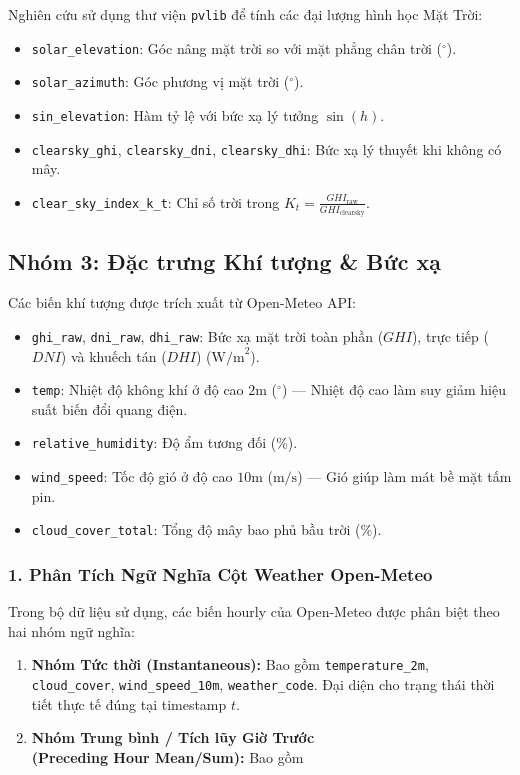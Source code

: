 \documentclass[12pt,a4paper]{article}
\begin{document}
Nghiên cứu sử dụng thư viện \texttt{pvlib} để tính các đại lượng hình học Mặt Trời:
\begin{itemize}
    \item \texttt{solar\_elevation}: Góc nâng mặt trời so với mặt phẳng chân trời ($^\circ$).
    \item \texttt{solar\_azimuth}: Góc phương vị mặt trời ($^\circ$).
    \item \texttt{sin\_elevation}: Hàm tỷ lệ với bức xạ lý tưởng $\sin(h)$.
    \item \texttt{clearsky\_ghi}, \texttt{clearsky\_dni}, \texttt{clearsky\_dhi}: Bức xạ lý thuyết khi không có mây.
    \item \texttt{clear\_sky\_index\_k\_t}: Chỉ số trời trong $K_t = \frac{GHI_{\text{raw}}}{GHI_{\text{clearsky}}}$.
\end{itemize}

\subsection[Nhóm 3: Đặc trưng Khí tượng]{Nhóm 3: Đặc trưng Khí tượng \& Bức xạ}
Các biến khí tượng được trích xuất từ Open-Meteo API:
\begin{itemize}
    \item \texttt{ghi\_raw}, \texttt{dni\_raw}, \texttt{dhi\_raw}: Bức xạ mặt trời toàn phần ($GHI$), trực tiếp ($DNI$) và khuếch tán ($DHI$) ($\text{W/m}^2$).
    \item \texttt{temp}: Nhiệt độ không khí ở độ cao $2\text{m}$ ($^\circ\text{}$) --- Nhiệt độ cao làm suy giảm hiệu suất biến đổi quang điện.
    \item \texttt{relative\_humidity}: Độ ẩm tương đối (\%).
    \item \texttt{wind\_speed}: Tốc độ gió ở độ cao $10\text{m}$ ($\text{m/s}$) --- Gió giúp làm mát bề mặt tấm pin.
    \item \texttt{cloud\_cover\_total}: Tổng độ mây bao phủ bầu trời (\%).
\end{itemize}

\subsubsection{1. Phân Tích Ngữ Nghĩa Cột Weather Open-Meteo}
Trong bộ dữ liệu sử dụng, các biến hourly của Open-Meteo được phân biệt theo hai nhóm ngữ nghĩa:
\begin{enumerate}
    \item \textbf{Nhóm Tức thời (Instantaneous):} Bao gồm \texttt{temperature\_2m}, \texttt{cloud\_cover}, \texttt{wind\_speed\_10m}, \texttt{weather\_code}. Đại diện cho trạng thái thời tiết thực tế đúng tại timestamp $t$.
\item \textbf{Nhóm Trung bình / Tích lũy Giờ Trước}\\ \textbf{(Preceding Hour Mean/Sum):} Bao gồm
\end{enumerate}
\end{document}
